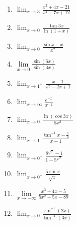 \documentclass[12pt]{article}
\newif\ifans
\begin{document}
\begin{enumerate}

\item $\lim_{x \rightarrow 3}{\frac{x^2+4x-21}{x^2-7x+12}}$

\ifans{\fbox{$-10$}} \fi

\item $ \lim_{x \rightarrow 0}{\frac{\tan{3x}}{\ln{(1+x)}}}$

\ifans{\fbox{$3$}} \fi

\item $\lim_{x \rightarrow 0}{\frac{\sin{x}-x}{x^2}}$

\ifans{\fbox{$0$}} \fi

\item $\lim\limits_{x\rightarrow 0} \frac{\sin{(6x)}}{\sin{(3x)}}$ 

\ifans{\fbox{$2$}} \fi

\item $\lim_{x \rightarrow 1^-}{\frac{x-1}{x^2-2x+1}}$

\ifans{\fbox{$-\infty$}} \fi

\item $\lim_{x \rightarrow \infty}{\frac{e^{-x}}{x^{-2}}}$

\ifans{\fbox{$0$}} \fi

\item $\lim_{x \rightarrow 0}{\frac{\ln{(\cos{3x})}}{5x^2}}$

\ifans{\fbox{$-\frac{9}{10}$}} \fi

\item $\lim_{x \rightarrow 1}{\frac{\tan^{-1}{x}-\frac{\pi}{4}}{x-1}}$

\ifans{\fbox{$\frac{1}{2}$}} \fi

\item $\lim_{x \rightarrow 0^{+}}{\frac{8^{\sqrt{x}}-1}{1-5^{\sqrt{x}}}}$

\ifans{\fbox{$-\frac{3\ln{2}}{\ln{5}}$}} \fi

\item $\lim_{x\rightarrow 0^{+}}{\frac{5\sin{x}}{\sqrt{x}}}$

\ifans{\fbox{$0$}} \fi

\item $\lim\limits_{x\rightarrow -\infty} \frac{x^3+4x-5}{5x^2-5x-89}$  

\ifans{\fbox{$-\infty$}} \fi

\item $\lim_{x \rightarrow 0}{\frac{\sin^{-1}{(2x)}}{\tan^{-1}{(3x)}}}$


\end{enumerate}
\end{document}
